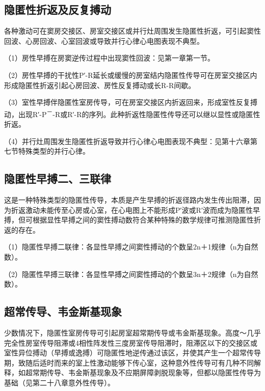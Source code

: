 \protect\hypertarget{text00042.htmlux5cux23subid461}{}{}

\subsection{隐匿性折返及反复搏动}

各种激动可在窦房交接区、房室交接区或并行灶周围发生隐匿性折返，可引起窦性回波、心房回波、心室回波或导致并行心律心电图表现不典型。

（1）房性早搏在房窦逆传过程中出现窦性回波：见第一章第一节。

（2）房性早搏的干扰性P′-R延长或缓慢的房室结内隐匿性传导可在房室交接区内形成隐匿性折返引起心房回波、房性反复搏动或长R-R间歇。

（3）室性早搏伴隐匿性室房传导，可在房室交接区内折返回来，形成室性反复搏动，出现R′-P\textsuperscript{－}-R或R′-R的序列。此种折返性隐匿性传导还可以继以显性或隐匿性折返。

（4）并行灶周围发生隐匿性折返导致并行心律心电图表现不典型：见第十六章第七节特殊类型的并行心律。

\protect\hypertarget{text00042.htmlux5cux23subid462}{}{}

\subsection{隐匿性早搏二、三联律}

这是一种特殊类型的隐匿性传导，本质是产生早搏的折返径路内发生传出阻滞，因为折返激动未能传至心房或心室，在心电图上不能形成P′波或R′波而成为隐匿性早搏，但可根据显性早搏之间的窦性搏动数符合某种特殊的数学规律可推测隐匿性折返的存在。

（1）隐匿性早搏二联律：各显性早搏之间窦性搏动的个数呈2n＋1规律（n为自然数）。

（2）隐匿性早搏三联律：各显性早搏之间窦性搏动的个数呈3n＋2规律（n为自然数）。

\protect\hypertarget{text00042.htmlux5cux23subid463}{}{}

\subsection{超常传导、韦金斯基现象}

少数情况下，隐匿性室房传导可引起房室超常期传导或韦金斯基现象。高度～几乎完全性房室传导阻滞或4相性阵发性三度房室传导阻滞时，阻滞区以下的交接区或室性异位搏动（早搏或逸搏）可隐匿性地逆传通过该区，并使其产生一个超常传导期，致随后适时而来的室上性激动能够下传心室，这种意外性传导可有几种不同解释，如超常期传导、韦金斯基现象及不应期屏障剥脱现象等，但都以隐匿性传导为基础（见第二十八章意外性传导）。

